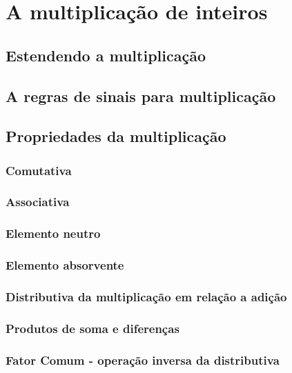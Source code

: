 \chapter[A multiplicação de inteiros]{A multiplicação de inteiros}

\section{Estendendo a multiplicação}

\section{A regras de sinais para multiplicação}


\section{Propriedades da multiplicação}

\subsection{Comutativa}

\subsection{Associativa}

\subsection{Elemento neutro}

\subsection{Elemento absorvente}

\subsection{Distributiva da multiplicação em relação a adição}

\subsection{Produtos de soma e diferenças}

\subsection{Fator Comum - operação inversa da distributiva}

